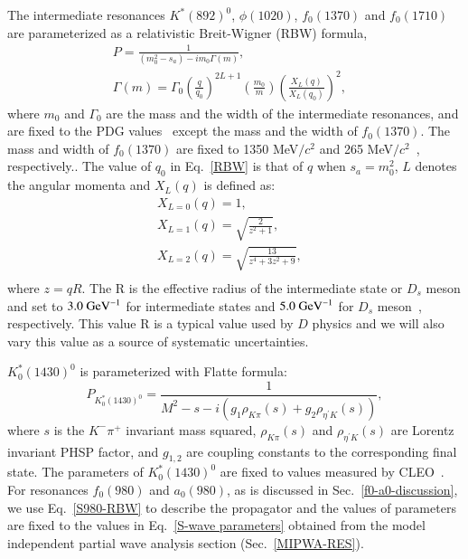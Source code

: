 {{        The intermediate resonances $K^{*}(892)^{0}$, $\phi(1020)$, $f_{0}(1370)$ and  $f_{0}(1710)$ are parameterized as a relativistic Breit-Wigner (RBW) formula,
        \begin{equation}
            \begin{array}{lr}
                P = \frac{1}{(m_{0}^{2} - s_{a} ) - im_{0}\Gamma(m)}, &\\
                \Gamma(m) = \Gamma_{0}\left(\frac{q}{q_{0}}\right)^{2L+1}\left(\frac{m_{0}}{m}\right)\left(\frac{X_{L}(q)}{X_{L}(q_{0})}\right)^{2}, &
            \end{array}\label{RBW} 
        \end{equation}
        where $m_{0}$ and $\Gamma_{0}$ are the mass and the width of the intermediate resonances, and are fixed to the PDG values~\cite{PDG2018} except the mass and the width of $f_{0}(1370)$. 
        The mass and width of $f_{0}(1370)$ are fixed to 1350 MeV$/c^{2}$ and 265 MeV$/c^{2}$~\cite{para-f01370}, respectively..
        The value of $q_{0}$ in Eq.~\ref{RBW} is that of $q$ when $s_{a}=m_{0}^{2}$, $L$ denotes the angular momenta and $X_{L}(q)$ is defined as:
        \begin{equation}
            \begin{array}{lr}
                X_{L=0}(q) = 1,       &\\
                X_{L=1}(q) = \sqrt{\frac{2}{z^{2}+1}},       &\\
                X_{L=2}(q) = \sqrt{\frac{13}{z^{4}+3z^{2}+9}},       &\\
            \end{array}\label{XLQ} 
        \end{equation}
        where $z=qR$. The R is the effective radius of the intermediate state or $D_{s}$ meson and set to $3.0\ {\rm GeV}^{-1}$ for intermediate states and $5.0\ {\rm GeV}^{-1}$  for $D_{s}$ meson~\cite{Doc-DB-416-v30}, respectively.
        This value R is a typical value used by $D$ physics and we will also vary this value as a source of systematic uncertainties.

        $K^{*}_{0}(1430)^{0}$ is parameterized with Flatte formula:
        \begin{equation}
            P_{K^{*}_{0}(1430)^{0}}= \frac{1}{M^{2} - s - i(g_{1}\rho_{K\pi}(s) + g_{2}\rho_{\eta^{'}K}(s))}, \label{Flatte}
        \end{equation}
        where $s$ is the $K^{-}\pi^{+}$ invariant mass squared,  $\rho_{K\pi}(s)$ and $\rho_{\eta^{'}K}(s)$ are Lorentz invariant PHSP factor, and   $g_{1,2}$ are coupling constants to the corresponding final state. The parameters of $K^{*}_{0}(1430)^{0}$ are fixed to values measured by CLEO~\cite{CLEO-Flatte}. 
        For resonances $f_{0}(980)$ and $a_{0}(980)$, as is discussed in Sec.~\ref{f0-a0-discussion}, we use Eq.~\ref{S980-RBW} to describe the propagator and the values of parameters are fixed to the values in Eq.~\ref{S-wave parameters} obtained from the model independent partial wave analysis section (Sec.~\ref{MIPWA-RES}).
    }

}
